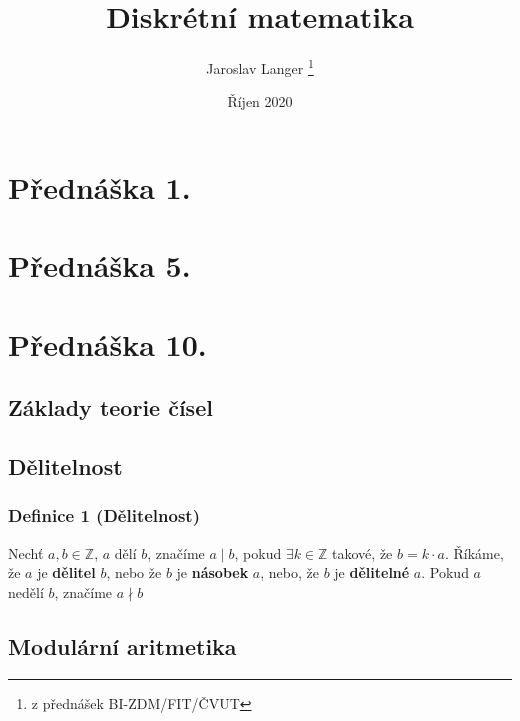 \documentclass[12pt, letterpaper, twoside]{article}
\title{Diskrétní matematika}
\author{Jaroslav Langer \thanks{z přednášek BI-ZDM/FIT/ČVUT}}
\date{Říjen 2020}
\begin{document}
\maketitle

\tableofcontents

\section{Přednáška 1.}

\section{Přednáška 5.}

\section{Přednáška 10.}

\subsection{Základy teorie čísel}

\subsection{Dělitelnost}

\subsubsection*{Definice 1 (Dělitelnost)}
Nechť $a,b \in \mathbb{Z}$, $a$ dělí $b$, značíme $a \mid b$, pokud $\exists k \in \mathbb{Z}$ takové, že
$b = k \cdot a$.
Říkáme, že $a$ je \textbf{dělitel} $b$, nebo že $b$ je \textbf{násobek} $a$, nebo, že $b$ je \textbf{dělitelné} $a$.
Pokud $a$ nedělí $b$, značíme $a \nmid b$

\subsection{Modulární aritmetika}
\end{document}
